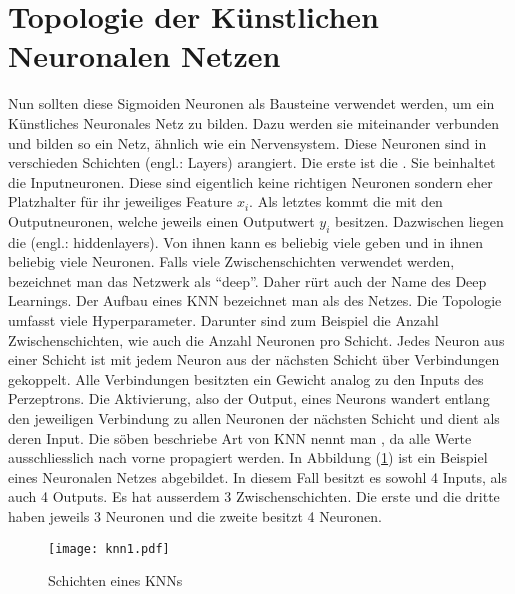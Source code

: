 \para{}
\cite{wiki:kuenstliches_neuron}
\cite{wiki:sigmoidfunktion}


\section{Topologie der Künstlichen Neuronalen Netzen}
Nun sollten diese Sigmoiden Neuronen als Bausteine verwendet werden, um ein Künstliches
Neuronales Netz zu bilden. Dazu werden sie miteinander verbunden und bilden so ein Netz,
ähnlich wie ein Nervensystem.
\para{}
Diese Neuronen sind in verschieden Schichten (engl.: Layers)
arangiert. Die erste ist die . Sie beinhaltet die
Inputneuronen. Diese sind eigentlich keine richtigen
Neuronen sondern eher Platzhalter für ihr jeweiliges Feature $x_i$. Als letztes kommt die
 mit den Outputneuronen, welche jeweils einen Outputwert $y_i$
besitzen. Dazwischen liegen die  (engl.: hiddenlayers). Von ihnen kann es
beliebig viele geben und in ihnen beliebig viele Neuronen.
Falls viele Zwischenschichten verwendet werden, bezeichnet man das Netzwerk als
``deep''. Daher rürt auch der Name des Deep Learnings.
Der Aufbau eines KNN bezeichnet man als  des Netzes. Die
Topologie umfasst viele Hyperparameter. Darunter sind zum Beispiel die Anzahl Zwischenschichten, wie auch
die Anzahl Neuronen pro Schicht.
\para{}
Jedes Neuron aus einer Schicht ist mit jedem Neuron aus der nächsten Schicht über
Verbindungen gekoppelt. Alle Verbindungen besitzten ein Gewicht analog zu den Inputs des
Perzeptrons. Die Aktivierung, also der Output, eines Neurons wandert entlang den jeweiligen
Verbindung zu allen Neuronen der nächsten Schicht und dient als deren Input.
Die söben beschriebe Art von KNN nennt man , da alle Werte
ausschliesslich nach vorne propagiert werden.
\para{}
In Abbildung (\ref{fig:nn_layers}) ist ein Beispiel eines Neuronalen Netzes
abgebildet. In diesem Fall besitzt es sowohl 4 Inputs, als auch 4 Outputs. Es hat
ausserdem 3 Zwischenschichten. Die erste und die dritte haben jeweils 3 Neuronen
und die zweite besitzt 4 Neuronen. \\

\begin{figure}[h!]
  \centering
  \texttt{[image: knn1.pdf]}
  \caption{Schichten eines KNNs}
  \label{fig:nn_layers}
\end{figure}

\cite{wiki:kuenstliches_neuronales_netz}
\cite{Nielsen}

